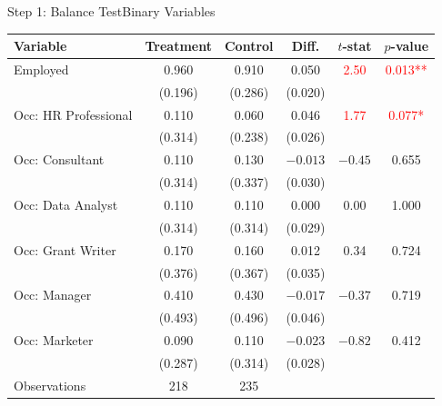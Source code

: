 \documentclass[hyperref={pdfpagelabels=false}]{beamer}
\begin{document}
\begin{frame}{Step 1: Balance Test}{Binary Variables}
	\begin{center}
		\begin{threeparttable}
			\linespread{1}
			\fontsize{8}{8pt}\selectfont
			\centering
			\begin{tabular}{@{}lccccc@{}}
				\toprule
				Variable & Treatment & Control & Diff. & $t$-stat & $p$-value \\
				\midrule\midrule
				Employed & 0.960 & 0.910 & 0.050 & \textcolor{red}{2.50} & \textcolor{red}{0.013**} \\
				 & (0.196) & (0.286) & (0.020) & & \\
				\midrule
				Occ: HR Professional & 0.110 & 0.060 & 0.046 & \textcolor{red}{1.77} & \textcolor{red}{0.077*} \\
				 & (0.314) & (0.238) & (0.026) & & \\
				Occ: Consultant & 0.110 & 0.130 & $-0.013$ & $-0.45$ & 0.655 \\
				 & (0.314) & (0.337) & (0.030) & & \\
				Occ: Data Analyst & 0.110 & 0.110 & 0.000 & 0.00 & 1.000 \\
				 & (0.314) & (0.314) & (0.029) & & \\
				Occ: Grant Writer & 0.170 & 0.160 & 0.012 & 0.34 & 0.724 \\
				 & (0.376) & (0.367) & (0.035) & & \\
				Occ: Manager & 0.410 & 0.430 & $-0.017$ & $-0.37$ & 0.719 \\
				 & (0.493) & (0.496) & (0.046) & & \\
				Occ: Marketer & 0.090 & 0.110 & $-0.023$ & $-0.82$ & 0.412 \\
				 & (0.287) & (0.314) & (0.028) & & \\
				\midrule\midrule
				Observations & 218 & 235 & & & \\
				\bottomrule
			\end{tabular}
		\end{threeparttable}
	\end{center}
\end{frame}
\end{document}
